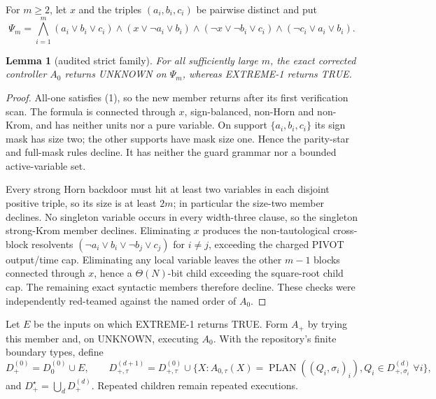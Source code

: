 \documentclass[11pt]{article}
\newtheorem{lemma}[theorem]{Lemma}
\begin{document}
For $m\ge2$, let $x$ and the triples $(a_i,b_i,c_i)$ be pairwise distinct and
put
\begin{equation}
\Psi_m=\bigwedge_{i=1}^{m}
 (a_i\vee b_i\vee c_i)\wedge
 (x\vee\neg a_i\vee b_i)\wedge
 (\neg x\vee\neg b_i\vee c_i)\wedge
 (\neg c_i\vee a_i\vee b_i).                 \tag{1}
\end{equation}

\begin{lemma}[audited strict family]
For all sufficiently large $m$, the exact corrected controller $A_0$ returns
UNKNOWN on $\Psi_m$, whereas \textsc{EXTREME-1} returns TRUE.
\end{lemma}
\begin{proof}
All-one satisfies (1), so the new member returns after its first verification
scan.  The formula is connected through $x$, sign-balanced, non-Horn and
non-Krom, and has neither units nor a pure variable.  On support
$\{a_i,b_i,c_i\}$ its sign mask has size two; the other supports have mask
size one.  Hence the parity-star and full-mask rules decline.  It has neither
the guard grammar nor a bounded active-variable set.

Every strong Horn backdoor must hit at least two variables in each disjoint
positive triple, so its size is at least $2m$; in particular the size-two
member declines.  No singleton variable occurs in every width-three clause,
so the singleton strong-Krom member declines.  Eliminating $x$ produces the
non-tautological cross-block resolvents
$(\neg a_i\vee b_i\vee\neg b_j\vee c_j)$ for $i\ne j$, exceeding the charged
PIVOT output/time cap.  Eliminating any local variable leaves the other
$m-1$ blocks connected through $x$, hence a $\Theta(N)$-bit child exceeding
the square-root child cap.  The remaining exact syntactic members therefore
decline.  These checks were independently red-teamed against the named order
of $A_0$.
\end{proof}

Let $E$ be the inputs on which \textsc{EXTREME-1} returns TRUE.  Form $A_+$ by
trying this member and, on UNKNOWN, executing $A_0$.  With the repository's
finite boundary types, define
\[
D_+^{(0)}=D_0^{(0)}\cup E,
\qquad
D_{+,\tau}^{(d+1)}=D_{+,\tau}^{(0)}\cup
\{X:A_{0,\tau}(X)=\operatorname{PLAN}((Q_i,\sigma_i)_i),
      Q_i\in D_{+,\sigma_i}^{(d)}\ \forall i\},
\]
and $D_+^\star=\bigcup_dD_+^{(d)}$.  Repeated children remain repeated
executions.
\end{document}
